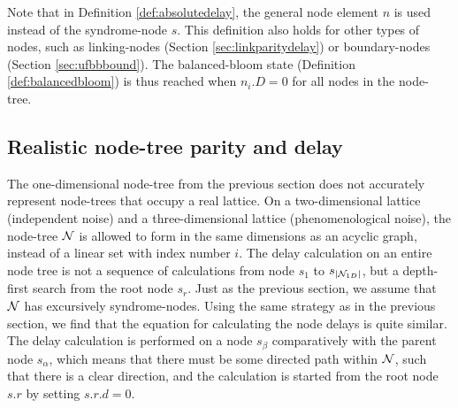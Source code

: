 Note that in Definition \ref{def:absolutedelay}, the general node element $n$ is used instead of the syndrome-node $s$. This definition also holds for other types of nodes, such as linking-nodes (Section \ref{sec:linkparitydelay}) or boundary-nodes (Section \ref{sec:ufbbbound}). The balanced-bloom state (Definition \ref{def:balancedbloom}) is thus reached when $n_i.D = 0$ for all nodes in the node-tree. 

\subsection{Realistic node-tree parity and delay}\label{sec:realisticnodetree}

The one-dimensional node-tree from the previous section does not accurately represent node-trees that occupy a real lattice. On a two-dimensional lattice (independent noise) and a three-dimensional lattice (phenomenological noise), the node-tree $\mathcal{N}$ is allowed to form in the same dimensions as an acyclic graph, instead of a linear set with index number $i$. The delay calculation on an entire node tree is not a sequence of calculations from node $s_1$ to $s_{|\mathcal{N}_{1D}|}$, but a depth-first search from the root node $s_r$. Just as the previous section, we assume that $\mathcal{N}$ has excursively syndrome-nodes. Using the same strategy as in the previous section, we find that the equation for calculating the node delays is quite similar. The delay calculation is performed on a node $s_\beta$ comparatively with the parent node $s_\alpha$, which means that there must be some directed path within $\mathcal{N}$, such that there is a clear direction, and the calculation is started from the root node $s.r$ by setting $s.r.d=0$.

